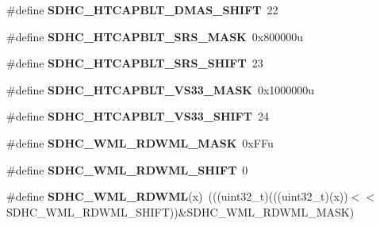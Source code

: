 \begin{DoxyCompactItemize}
\item 
\#define {\bfseries S\+D\+H\+C\+\_\+\+H\+T\+C\+A\+P\+B\+L\+T\+\_\+\+D\+M\+A\+S\+\_\+\+S\+H\+I\+FT}~22\hypertarget{group__SDHC__Register__Masks_gab0236dd93e36239ae39f6b813eeb11a1}{}\label{group__SDHC__Register__Masks_gab0236dd93e36239ae39f6b813eeb11a1}

\item 
\#define {\bfseries S\+D\+H\+C\+\_\+\+H\+T\+C\+A\+P\+B\+L\+T\+\_\+\+S\+R\+S\+\_\+\+M\+A\+SK}~0x800000u\hypertarget{group__SDHC__Register__Masks_ga62e346d8925d26124eb284b4ebf984d3}{}\label{group__SDHC__Register__Masks_ga62e346d8925d26124eb284b4ebf984d3}

\item 
\#define {\bfseries S\+D\+H\+C\+\_\+\+H\+T\+C\+A\+P\+B\+L\+T\+\_\+\+S\+R\+S\+\_\+\+S\+H\+I\+FT}~23\hypertarget{group__SDHC__Register__Masks_ga47c009f4b74a67296231bb73fa1c74f8}{}\label{group__SDHC__Register__Masks_ga47c009f4b74a67296231bb73fa1c74f8}

\item 
\#define {\bfseries S\+D\+H\+C\+\_\+\+H\+T\+C\+A\+P\+B\+L\+T\+\_\+\+V\+S33\+\_\+\+M\+A\+SK}~0x1000000u\hypertarget{group__SDHC__Register__Masks_gaefb26b10e16d07a763c3a6aa87d64c77}{}\label{group__SDHC__Register__Masks_gaefb26b10e16d07a763c3a6aa87d64c77}

\item 
\#define {\bfseries S\+D\+H\+C\+\_\+\+H\+T\+C\+A\+P\+B\+L\+T\+\_\+\+V\+S33\+\_\+\+S\+H\+I\+FT}~24\hypertarget{group__SDHC__Register__Masks_ga134420d6cffd9c730caecd7cc64f1d41}{}\label{group__SDHC__Register__Masks_ga134420d6cffd9c730caecd7cc64f1d41}

\item 
\#define {\bfseries S\+D\+H\+C\+\_\+\+W\+M\+L\+\_\+\+R\+D\+W\+M\+L\+\_\+\+M\+A\+SK}~0x\+F\+Fu\hypertarget{group__SDHC__Register__Masks_gae6b31e76805f36f9903c70818642decc}{}\label{group__SDHC__Register__Masks_gae6b31e76805f36f9903c70818642decc}

\item 
\#define {\bfseries S\+D\+H\+C\+\_\+\+W\+M\+L\+\_\+\+R\+D\+W\+M\+L\+\_\+\+S\+H\+I\+FT}~0\hypertarget{group__SDHC__Register__Masks_gaccbe2485e8ba11877a5d0c45efef3cf5}{}\label{group__SDHC__Register__Masks_gaccbe2485e8ba11877a5d0c45efef3cf5}

\item 
\#define {\bfseries S\+D\+H\+C\+\_\+\+W\+M\+L\+\_\+\+R\+D\+W\+ML}(x)~(((uint32\+\_\+t)(((uint32\+\_\+t)(x))$<$$<$S\+D\+H\+C\+\_\+\+W\+M\+L\+\_\+\+R\+D\+W\+M\+L\+\_\+\+S\+H\+I\+FT))\&S\+D\+H\+C\+\_\+\+W\+M\+L\+\_\+\+R\+D\+W\+M\+L\+\_\+\+M\+A\+SK)\hypertarget{group__SDHC__Register__Masks_gad9a5ef012064c89985cefc46d8b98614}{}\label{group__SDHC__Register__Masks_gad9a5ef012064c89985cefc46d8b98614}


\end{DoxyCompactItemize}

